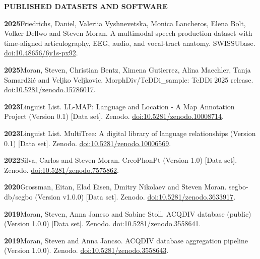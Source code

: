 \documentclass[11pt]{article}
\newcommand{\hangpara}{
 \setlength{\parindent}{0in} %
 \hangindent=0.42in %
}
\begin{document}
\vskip 20pt
\begin{flushleft}
{\bf PUBLISHED DATASETS AND SOFTWARE}
\end{flushleft}

\hangpara
{\bf 2025}\hspace{1ex}Friedrichs, Daniel, Valeriia Vyshnevetska, Monica Lancheros, Elena Bolt, Volker Dellwo and Steven Moran. A multimodal speech-production dataset with time-aligned articulography, EEG, audio, and vocal-tract anatomy. SWISSUbase. \href{https://doi.org/10.48656/6y1s-px92}{doi:10.48656/6y1s-px92}.

\vskip 6pt
\hangpara
{\bf 2025}\hspace{1ex}Moran, Steven, Christian Bentz, Ximena Gutierrez, Alina Maechler, Tanja Samardžić and Veljko Veljkovic. MorphDiv/TeDDi\_sample: TeDDi 2025 release. \href{https://doi.org/10.5281/zenodo.15786017}{doi:10.5281/zenodo.15786017}.

\vskip 6pt
\hangpara
{\bf 2023}\hspace{1ex}Linguist List. LL-MAP: Language and Location - A Map Annotation Project (Version 0.1) [Data set]. Zenodo. \href{https://zenodo.org/doi/10.5281/zenodo.10008714}{doi:10.5281/zenodo.10008714}.

\vskip 6pt
\hangpara
{\bf 2023}\hspace{1ex}Linguist List. MultiTree: A digital library of language relationships (Version 0.1) [Data set]. Zenodo. \href{https://zenodo.org/doi/10.5281/zenodo.10006569}{doi:10.5281/zenodo.10006569}.

\vskip 6pt
\hangpara
{\bf 2022}\hspace{1ex}Silva, Carlos and Steven Moran. CreoPhonPt (Version 1.0) [Data set]. Zenodo. \href{https://doi.org/10.5281/zenodo.7575862}{doi:10.5281/\allowbreak zenodo.7575862}.

\vskip 6pt
\hangpara
{\bf 2020}\hspace{1ex}Grossman, Eitan, Elad Eisen, Dmitry Nikolaev and Steven Moran. segbo-db/segbo (Version v1.0.0) [Data set]. Zenodo. \href{https://doi.org/10.5281/zenodo.3633917}{doi:10.5281/zenodo.3633917}. %

\vskip 6pt
\hangpara
{\bf 2019}\hspace{1ex}Moran, Steven, Anna Jancso and Sabine Stoll. ACQDIV database (public) (Version 1.0.0) [Data set]. Zenodo. \href{https://doi.org/10.5281/zenodo.3558641}{doi:10.5281/zenodo.3558641}.

\vskip 6pt
\hangpara
{\bf 2019}\hspace{1ex}Moran, Steven and Anna Jancso. ACQDIV database aggregation pipeline (Version 1.0.0). Zenodo. \href{https://doi.org/10.5281/zenodo.3558643}{doi:10.5281/zenodo.3558643}. %
\end{document}
